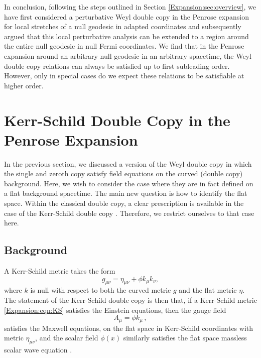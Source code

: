 In conclusion, following the steps outlined in Section \ref{Expansion:sec:overview}, we have first considered a perturbative Weyl double copy in the Penrose expansion for local stretches of a null geodesic in adapted coordinates and subsequently argued that this local perturbative analysis can be extended to a region around the entire null geodesic in null Fermi coordinates. We find that in the Penrose expansion around an arbitrary null geodesic in an arbitrary spacetime, the Weyl double copy relations can always be satisfied up to first subleading order. However, only in special cases do we expect these relations to be satisfiable at higher order.

\section{Kerr-Schild Double Copy in the Penrose Expansion} \label{Expansion:sec:kerrschild}

In the previous section, we discussed a version of the Weyl double copy in which the single and zeroth copy satisfy field equations on the curved (double copy) background. Here, we wish to consider the case where they are in fact defined on a flat background spacetime. The main new question is how to identify the flat space. Within the classical double copy, a clear prescription is available in the case of the Kerr-Schild double copy \cite{Monteiro:2014cda}. Therefore, we restrict ourselves to that case here.

\subsection{Background}

A Kerr-Schild metric takes the form
\begin{equation}\label{Expansion:eqn:KS}
g_{\mu \nu} = \eta_{\mu \nu} + \phi k_{\mu} k_{\nu},
\end{equation}
where $k$ is null with respect to both the curved metric $g$ and the flat metric $\eta$. The statement of the Kerr-Schild double copy is then that, if a Kerr-Schild metric \eqref{Expansion:eqn:KS} satisfies the Einstein equations, then the gauge field
\begin{equation}
A_{\mu} = \phi k_{\mu} \, ,
\end{equation}
satisfies the Maxwell equations, on the flat space in Kerr-Schild coordinates with metric $\eta_{\mu \nu}$, and the scalar field $\phi(x)$ similarly satisfies the flat space massless scalar wave equation \cite{Monteiro:2014cda}.

